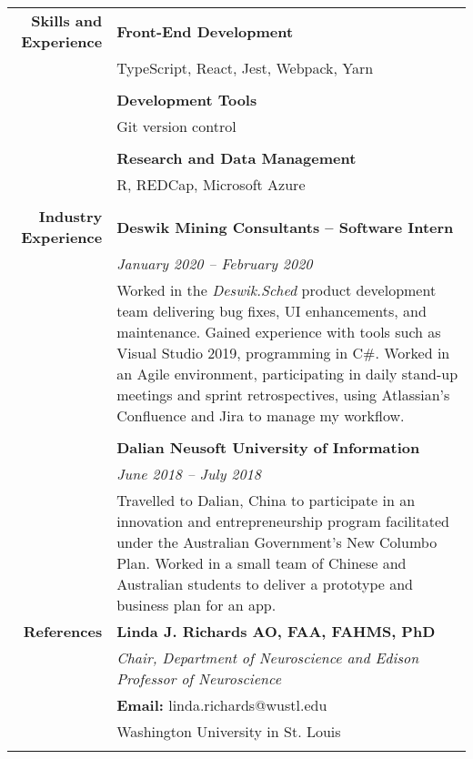 \documentclass{article}
\begin{document}
\begin{longtable}{r | p{13cm}}
		\large\textbf{Skills and Experience}& \large\textbf{Front-End Development} \\
											& TypeScript, React, Jest, Webpack, Yarn \\
											& \\

											& \large\textbf{Development Tools} \\
											& Git version control \\
											& \\

											& \large\textbf{Research and Data Management} \\
											& R, REDCap, Microsoft Azure \\
											& \\

		\large\textbf{Industry Experience} 	& \large\textbf{Deswik Mining Consultants – Software Intern} \\
											& \textit{January 2020 – February 2020} \\
											& Worked in the \textit{Deswik.Sched} product development team delivering bug fixes, UI enhancements, and maintenance. Gained experience with tools such as Visual Studio 2019, programming in C\#. Worked in an Agile environment, participating in daily stand-up meetings and sprint retrospectives, using Atlassian’s Confluence and Jira to manage my workflow. \\ 
											& \\

											& \large\textbf{Dalian Neusoft University of Information} \\
											& \textit{June 2018 – July 2018} \\
											& Travelled to Dalian, China to participate in an innovation and entrepreneurship program facilitated under the Australian Government’s New Columbo Plan. Worked in a small team of Chinese and Australian students to deliver a prototype and business plan for an app. \\

											\pagebreak

		\large\textbf{References} 	  		& \large\textbf{Linda J. Richards AO, FAA, FAHMS, PhD} \\
											& \textit{Chair, Department of Neuroscience and Edison Professor of Neuroscience} \\
											& \textbf{Email:} linda.richards@wustl.edu \\
											& Washington University in St. Louis \\
											& \\


\end{longtable}
\end{document}
